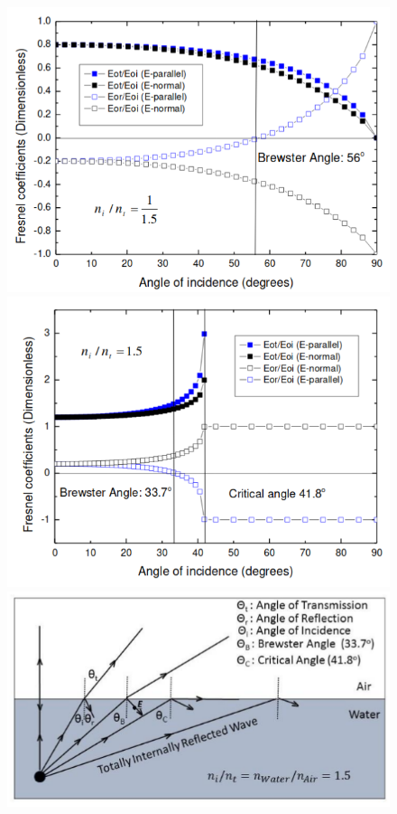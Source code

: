 \documentclass[a4paper, 11pt, normalem]{report}
\begin{document}
\begin{figure}[H]
	\centering
	\includegraphics[scale=0.35]{brews.png}
	\includegraphics[scale=0.35]{crits.png} \\
	\includegraphics[scale=0.4]{tint.png}
\end{figure}
\end{document}

